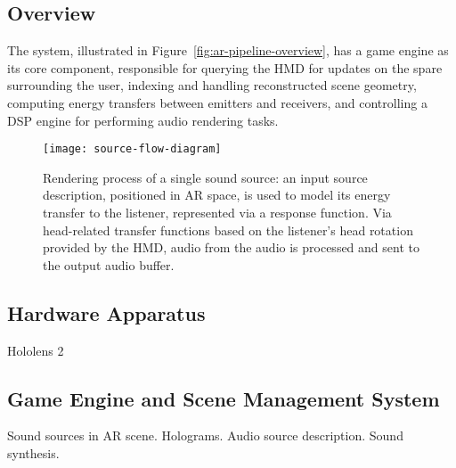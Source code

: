 \subsection{Overview}
The system, illustrated in Figure~\ref{fig:ar-pipeline-overview}, has a game engine as its core component, responsible for querying the HMD for updates on the spare surrounding the user, indexing and handling reconstructed scene geometry, computing energy transfers between emitters and receivers, and controlling a DSP engine for performing audio rendering tasks.
\begin{figure}[htb]
    \centering
    \texttt{[image: source-flow-diagram]}
    \caption{Rendering process of a single sound source: an input source description, positioned in AR space, is used to model its energy transfer to the listener, represented via a response function. Via head-related transfer functions based on the listener's head rotation provided by the HMD, audio from the audio is processed and sent to the output audio buffer.}
\label{fig:source-flow-diagram}
\end{figure}

\subsection{Hardware Apparatus}
Hololens 2

\subsection{Game Engine and Scene Management System}
Sound sources in AR scene. Holograms. Audio source description. Sound synthesis.


